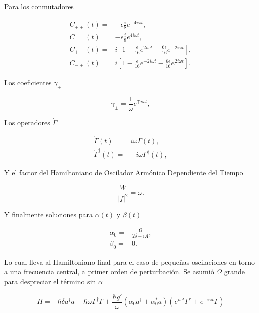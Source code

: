 \documentclass[10pt]{beamer}
\begin{document}
\begin{frame}
Para los conmutadores

\begin{align*}
C_{++}(t) =& -\epsilon\frac{i}{8}e^{-4i\omega t},\\
C_{--}(t) =& -\epsilon\frac{i}{8}e^{4i\omega t},\\
C_{+-}(t) =& i [1 -\frac{\epsilon}{16}e^{2i\omega t}-\frac{6\epsilon}{16}e^{-2i\omega t}],\\
C_{-+}(t) =& i [1 -\frac{\epsilon}{16}e^{-2i\omega t}-\frac{6\epsilon}{16}e^{2i\omega t}].
\end{align*}

\end{frame}

\begin{frame}
Los coeficientes $\gamma_\pm$

\begin{equation*}
\gamma_\pm= \frac{1}{\omega}e^{\mp i\omega t},
\end{equation*}

Los operadores $\dot{\Gamma}$

\begin{align*}
\dot{\Gamma}(t) =& i\omega \Gamma(t),\\
\dot{\Gamma}^\dagger(t) =& -i\omega \Gamma^\dagger(t),
\end{align*}

Y el factor del Hamiltoniano de Oscilador Armónico Dependiente del Tiempo

\begin{equation*}
\frac{W}{|f|^2} = \omega.
\end{equation*}

\end{frame}

\begin{frame}
Y finalmente soluciones para $\alpha(t)$ y $\beta(t)$

\begin{align*}
\alpha_0 =& \frac{\Omega}{2\delta-iA},\\
\beta_0 =& 0.
\end{align*}

Lo cual lleva al Hamiltoniano final para el caso de pequeñas oscilaciones en torno a una frecuencia central, a primer orden de perturbación. Se asumió $\Omega$ grande para despreciar el término sin $\alpha$ 

\begin{equation*}
H = -\hbar \delta a^{\dagger}a +\hbar\omega\Gamma^{\dagger}\Gamma +\frac{\hbar g'}{\omega}(\alpha_0 a^{\dagger}+\alpha^*_0 a)(e^{i\omega t}\Gamma^{\dagger}+e^{-i\omega t}\Gamma)
\end{equation*}
\end{frame}
\end{document}
